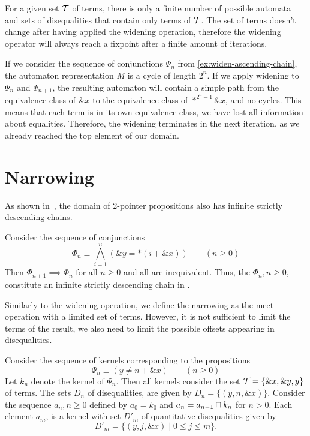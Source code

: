 For a given set $\mathcal{T}$ of terms, there is only a finite number of possible automata and sets of disequalities that contain only terms of $\mathcal{T}$.
The set of terms doesn't change after having applied the widening operation, therefore the widening operator will always reach a fixpoint after a finite amount of iterations.

\begin{example}\label{ex:widen}
  If we consider the sequence of conjunctions $\Psi_n$ from \cref{ex:widen-ascending-chain}, the automaton representation $M$ is a cycle of length $2^n$.
  If we apply widening to $\Psi_n$ and $\Psi_{n+1}$, the resulting automaton will contain a simple path from the equivalence class of $\&x$ to the equivalence class of $*^{2^{n}-1}\&x$,
  and no cycles.
  This means that each term is in its own equivalence class, we have lost all information about equalities.
  Therefore, the widening terminates in the next iteration,
  as we already reached the top element of our domain.
\end{example}

\section{Narrowing}

As shown in~\cite{2pointer}, the domain of 2-pointer propositions also has infinite strictly descending chains.

\begin{example}
	Consider the sequence of conjunctions
	\[
	\Phi_n \equiv\bigwedge_{i=1}^n (\&y = *(i+\&x))\qquad(n\geq 0)
	\]
	Then $\Phi_{n+1}\implies\Phi_n$ for all $n\geq 0$ and all are inequivalent.
	Thus, the $\Phi_n,n\geq 0$, constitute an infinite strictly descending chain in \cpo.
\end{example}

Similarly to the widening operation, we define the narrowing as the meet operation with a limited set of terms.
However, it is not sufficient to limit the terms of the result, we also need to limit the possible offsets
appearing in disequalities.\cite{new-paper-todo}

\begin{example}\label{e:narrow1}
	Consider the sequence of kernels corresponding to the propositions
	\[
	\Psi_n \equiv (y\neq n+\&x)\qquad(n\geq 0)
	\]
	Let $k_n$ denote the kernel of $\Psi_n$.
  Then all kernels consider the set $\mathcal{T}=\{\&x,\&y,y\}$ of terms.
	The sets $D_n$ of disequalities, are given by $D_n=\{(y,n,\&x)\}$.
  Consider the sequence $a_n, n\geq 0$ defined by $a_0 = k_0$ and $a_n = a_{n-1}\sqcap k_n$ for $n>0$.
  Each element $a_m$, is a kernel with set $D'_m$ of quantitative disequalities given by
	\[
	D'_m = \{(y,j,\&x)\mid 0\leq j\leq m\}.
	\]
\end{example}

